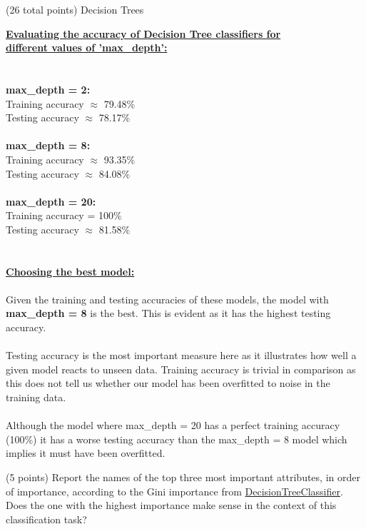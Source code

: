 \documentclass[12pt]{article}
\begin{document}
\begin{question}{(26 total points) Decision Trees}
\begin{subquestion}
\begin{answerbox}{39em}
\large{\textbf{\underline{Evaluating the accuracy of Decision Tree classifiers for}}}\\
\large{\textbf{\underline{different values of 'max\_depth':}}}\\
\\
\\
\normalsize{\textbf{max\_depth = 2:}}\\
\footnotesize{
Training accuracy $\approx$ 79.48\%\\
Testing accuracy $\approx$ 78.17\%\\
}
\\
\normalsize{\textbf{max\_depth = 8:}}\\
\footnotesize{
Training accuracy $\approx$ 93.35\%\\
Testing accuracy $\approx$ 84.08\%\\
}
\\
\normalsize{\textbf{max\_depth = 20:}}\\
\footnotesize{
Training accuracy = 100\%\\
Testing accuracy $\approx$ 81.58\%
}
\\
\\
\\
\normalsize{\textbf{\underline{Choosing the best model:}}\\
\\
Given the training and testing accuracies of these models, the model with \textbf{max\_depth = 8} is the best. This is evident as it has the highest testing accuracy.\\
\\
Testing accuracy is the most important measure here as it illustrates how well a given model reacts to unseen data. Training accuracy is trivial in comparison as this does not tell us whether our model has been overfitted to noise in the training data.\\
\\
Although the model where max\_depth = 20 has a perfect training accuracy (100\%) it has a worse testing accuracy than the max\_depth = 8 model which implies it must have been overfitted.
}
\end{answerbox}



\end{subquestion}


%
%
\begin{subquestion}{(5 points) 
Report the names of the top three most important attributes, in order of importance, according to the Gini importance from \href{https://scikit-learn.org/0.19/modules/generated/sklearn.tree.DecisionTreeClassifier.html}{DecisionTreeClassifier}. 
Does the one with the highest importance make sense in the context of this classification task? \\
}



\end{subquestion}
\end{question}
\end{document}
